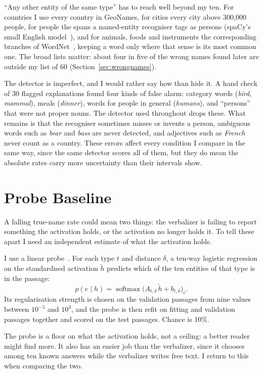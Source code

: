 ``Any other entity of the same type'' has to reach well beyond my ten. For countries I use every country in
GeoNames, for cities every city above 300{,}000 people, for people the spans a named-entity recogniser tags
as persons (spaCy's small English model~\cite{spacy}), and for animals, foods and instruments the
corresponding branches of WordNet~\cite{miller1995wordnet}, keeping a word only where that sense is its most
common one. The broad lists matter: about four in five of the wrong names found later are outside my list of
60 (Section~\ref{sec:wrongnames}).

The detector is imperfect, and I would rather say how than hide it. A hand check of 30 flagged explanations
found four kinds of false alarm: category words (\emph{bird}, \emph{mammal}), meals (\emph{dinner}), words
for people in general (\emph{humans}), and ``persons'' that were not proper nouns. The detector used
throughout drops these. What remains is that the recogniser sometimes misses or invents a person, ambiguous
words such as \emph{bear} and \emph{bass} are never detected, and adjectives such as \emph{French} never
count as a country. These errors affect every condition I compare in the same way, since the same detector
scores all of them, but they do mean the absolute rates carry more uncertainty than their intervals show.

\section{Probe Baseline}

A falling true-name rate could mean two things: the verbalizer is failing to report something the activation
holds, or the activation no longer holds it. To tell these apart I need an independent estimate of what the
activation holds.

I use a linear probe~\cite{alain2016probes}. For each type $t$ and distance $\delta$, a ten-way logistic
regression on the standardised activation $\tilde h$ predicts which of the ten entities of that type is in
the passage:
\begin{equation}
p(e \mid h) = \operatorname{softmax}\bigl(A_{t,\delta}\, \tilde h + b_{t,\delta}\bigr)_e .
\end{equation}
Its regularisation strength is chosen on the validation passages from nine values between $10^{-5}$ and
$10^{3}$, and the probe is then refit on fitting and validation passages together and scored on the test
passages. Chance is 10\%.

The probe is a floor on what the activation holds, not a ceiling: a better reader might find more. It also
has an easier job than the verbalizer, since it chooses among ten known answers while the verbalizer writes
free text. I return to this when comparing the two.

